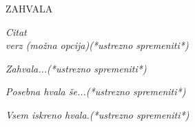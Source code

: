 
  \begin{center}
    \Large
    ZAHVALA
  \end{center}

  \vspace{1cm}

  \textit{Citat\\
    verz (mo\v zna opcija)(*ustrezno spremeniti*)}

  \vspace{2cm}

  \begin{sloppypar}
    \textit{Zahvala...(*ustrezno spremeniti*)}
  \end{sloppypar}

  \begin{sloppypar}
    \textit{Posebna hvala  \v se...(*ustrezno spremeniti*)}
  \end{sloppypar}



  \vspace{1cm}
  \begin{sloppypar}

    \textit{Vsem iskreno hvala.(*ustrezno spremeniti*)}
  \end{sloppypar}

  \vfill


